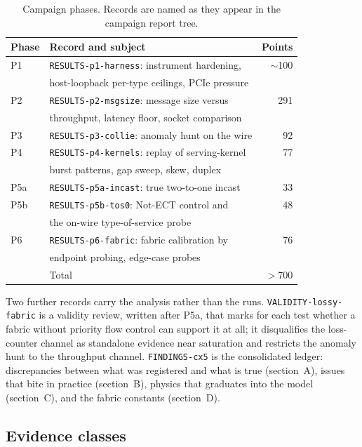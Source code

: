 \begin{table}[t]
  \centering
  \small
  \caption{Campaign phases. Records are named as they appear in the campaign
    report tree.}
  \label{tab:phases}
  \begin{tabular}{@{}llr@{}}
    \toprule
    Phase & Record and subject & Points \\
    \midrule
    P1  & \texttt{RESULTS-p1-harness}: instrument hardening, & $\sim$100 \\
        & host-loopback per-type ceilings, PCIe pressure & \\
    P2  & \texttt{RESULTS-p2-msgsize}: message size versus & 291 \\
        & throughput, latency floor, socket comparison & \\
    P3  & \texttt{RESULTS-p3-collie}: anomaly hunt on the wire & 92 \\
    P4  & \texttt{RESULTS-p4-kernels}: replay of serving-kernel & 77 \\
        & burst patterns, gap sweep, skew, duplex & \\
    P5a & \texttt{RESULTS-p5a-incast}: true two-to-one incast & 33 \\
    P5b & \texttt{RESULTS-p5b-tos0}: Not-ECT control and & 48 \\
        & the on-wire type-of-service probe & \\
    P6  & \texttt{RESULTS-p6-fabric}: fabric calibration by & 76 \\
        & endpoint probing, edge-case probes & \\
    \midrule
    & Total & $>$700 \\
    \bottomrule
  \end{tabular}
\end{table}

Two further records carry the analysis rather than the runs.
\texttt{VALIDITY-lossy-fabric} is a validity review, written after P5a, that
marks for each test whether a fabric without priority flow control can support
it at all; it disqualifies the loss-counter channel as standalone evidence near
saturation and restricts the anomaly hunt to the throughput channel.
\texttt{FINDINGS-cx5} is the consolidated ledger: discrepancies between what
was registered and what is true (section~A), issues that bite in practice
(section~B), physics that graduates into the model (section~C), and the fabric
constants (section~D).

\subsection{Evidence classes}

